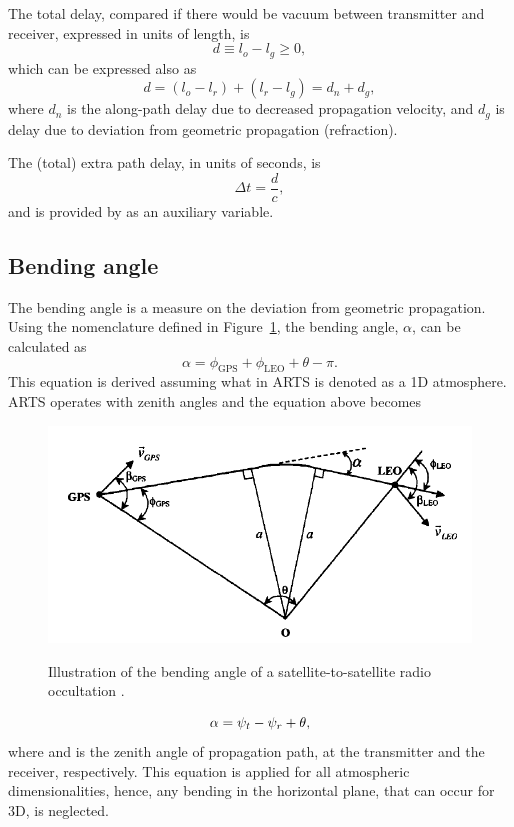 The total delay, compared if there would be vacuum between transmitter and
receiver, expressed in units of length, is
\begin{equation}
d \equiv l_o-l_g \ge 0,
\end{equation}
which can be expressed also as
\begin{equation} 
d = (l_o-l_r) + (l_r-l_g) = d_{n}+d_{g},
\end{equation}
where $d_{n}$ is the along-path delay due to decreased propagation velocity,
and $d_{g}$ is delay due to deviation from geometric propagation (refraction).

The (total) extra path delay, in units of seconds, is
\begin{equation} 
\Delta t = \frac{d}{c},
\end{equation}
and is provided by  as an auxiliary variable. 


\subsection{Bending angle}
%
The bending angle is a measure on the deviation from geometric propagation.
Using the nomenclature defined in Figure~\ref{fig:rlink:bangle}, the bending
angle, $\alpha$, can be calculated as \citep[e.g.][Eq.~6]{schreiner:99}
\begin{displaymath}
  \alpha = \phi_{\mathrm{GPS}} + \phi_{\mathrm{LEO}} + \theta - \pi.
\end{displaymath}
This equation is derived assuming what in ARTS is denoted as a 1D atmosphere.
ARTS operates with zenith angles and the equation above becomes
\begin{figure}[!tb]
 \begin{center}
  \includegraphics*[width=0.7\hsize]{bangle.png}\\
  \caption{Illustration of the bending angle of a satellite-to-satellite radio
    occultation \citep[copied from][Fig.~2]{schreiner:99}.}
 \end{center}
 \label{fig:rlink:bangle}
\end{figure}
\begin{equation} 
  \alpha = \psi_{t} - \psi_{r} + \theta,
  \label{eq:rlink:bangle}
\end{equation}
where  and  is the zenith angle of propagation path, at
the transmitter and the receiver, respectively. This equation is applied for
all atmospheric dimensionalities, hence, any bending in the horizontal plane,
that can occur for 3D, is neglected.

